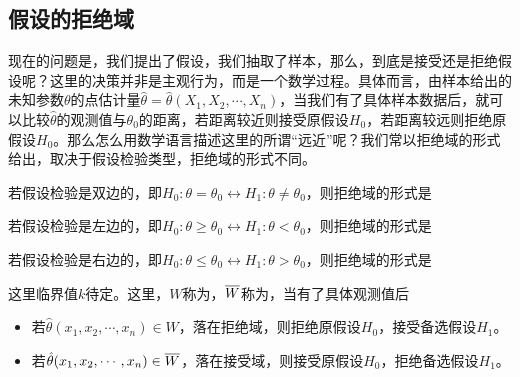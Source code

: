 \subsection{假设的拒绝域}
现在的问题是，我们提出了假设，我们抽取了样本，那么，到底是接受还是拒绝假设呢？这里的决策并非是主观行为，而是一个数学过程。具体而言，由样本给出的未知参数$\theta$的点估计量$\hat{\theta}=\hat{\theta}(X_1,X_2,\cdots,X_n)$，当我们有了具体样本数据后，就可以比较$\hat{\theta}$的观测值与$\theta_0$的距离，若距离较近则接受原假设$H_0$，若距离较远则拒绝原假设$H_0$。那么怎么用数学语言描述这里的所谓“远近”呢？我们常以拒绝域的形式给出，取决于假设检验类型，拒绝域的形式不同。

\begin{BoxDefinition}[双边检验的拒绝域]
    若假设检验是双边的，即$H_0:\theta=\theta_0\leftrightarrow H_1:\theta\neq\theta_0$，则拒绝域的形式是
\end{BoxDefinition}

\begin{BoxDefinition}[左边检验的拒绝域]
    若假设检验是左边的，即$H_0:\theta\geq\theta_0\leftrightarrow H_1:\theta<\theta_0$，则拒绝域的形式是
\end{BoxDefinition}

\begin{BoxDefinition}[右边检验的拒绝域]
    若假设检验是右边的，即$H_0:\theta\leq\theta_0\leftrightarrow H_1:\theta>\theta_0$，则拒绝域的形式是
\end{BoxDefinition}

这里临界值$k$待定。这里，$W$称为，$\overline{W}$称为，当有了具体观测值后
\begin{itemize}
    \item 若$\hat{\theta}(x_1,x_2,\cdots,x_n)\in W$，落在拒绝域，则拒绝原假设$H_0$，接受备选假设$H_1$。
    \item 若$\hat{\theta}(x_1,x_2,\cdots,x_n)\in\overline{W}$，落在接受域，则接受原假设$H_0$，拒绝备选假设$H_1$。
\end{itemize}

